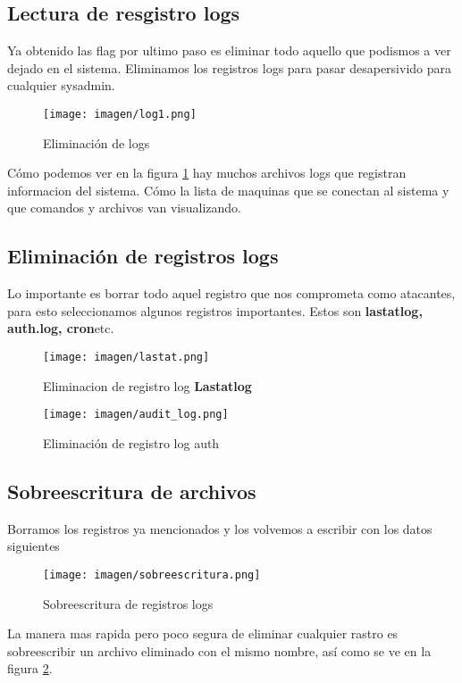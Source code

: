 \documentclass[a4paper]{article} %
\begin{document}
\subsection{Lectura de resgistro logs}
Ya obtenido las flag por ultimo paso es eliminar todo aquello que podismos a ver dejado en el sistema.
Eliminamos los registros logs para pasar desapersivido para cualquier sysadmin.
\vspace{0.3cm}
\begin{figure}[h]
    \centering
    \texttt{[image: imagen/log1.png]}
    \caption{Eliminación de logs}
    \label{fig:servicesLogs}   
\end{figure}

\vspace{0.5cm}
Cómo podemos ver en la figura \ref{fig:servicesLogs} hay muchos archivos logs que registran informacion del sistema.
Cómo la lista de maquinas que se conectan al sistema y que comandos y archivos van visualizando.
\clearpage
\subsection{Eliminación de registros logs}
\vspace{0.3cm}
Lo importante es borrar todo aquel registro que nos comprometa como atacantes, para esto seleccionamos algunos registros importantes.
Estos son \textbf{lastatlog, auth.log, cron}etc.
\vspace{0.3cm}
\begin{figure}[h]
    \centering
    \texttt{[image: imagen/lastat.png]}
    \caption{Eliminacion de registro log \textbf{Lastatlog}}
    \vspace{0.3cm}
    \texttt{[image: imagen/audit\_log.png]}
    \caption{Eliminación de registro log auth}   
\end{figure}
\clearpage
\subsection{Sobreescritura de archivos}
\vspace{0.3cm}
Borramos los registros ya mencionados y los volvemos a escribir con los datos siguientes
\vspace{0.5cm}
\begin{figure}[h]
    \centering
    \texttt{[image: imagen/sobreescritura.png]}
    \caption{Sobreescritura de registros logs}
    \label{fig:serviceseescritura}    
\end{figure}
\vspace{0.3cm}
La manera mas rapida pero poco segura de eliminar cualquier rastro es sobreescribir un archivo eliminado con el mismo nombre, así como
se ve en la figura \ref{fig:serviceseescritura}.
\end{document}
